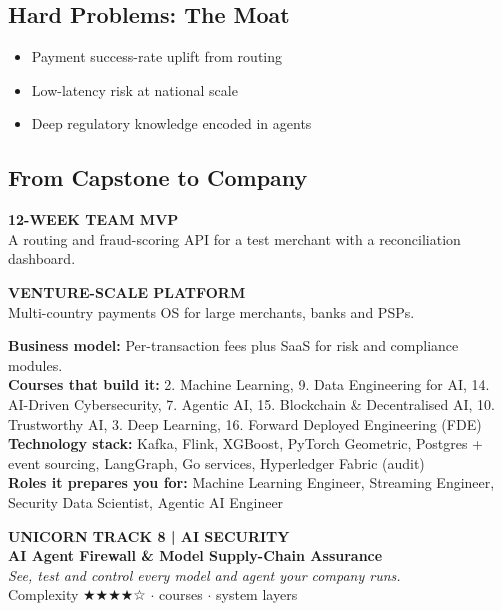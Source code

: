 \documentclass[10pt,a4paper]{article}
\begin{document}
\subsection*{Hard Problems: The Moat}\begin{itemize}\small
\item Payment success-rate uplift from routing
\item Low-latency risk at national scale
\item Deep regulatory knowledge encoded in agents
\end{itemize}
\subsection*{From Capstone to Company}
\begin{tcbraster}[raster columns=2,raster equal height,raster column skip=8pt]\begin{tcolorbox}[colback=l1bg,colframe=l1bg,arc=2pt,borderline north={2.5pt}{0pt}{saffron}]{\scriptsize\bfseries\color{muted}12-WEEK TEAM MVP}\\\small A routing and fraud-scoring API for a test merchant with a reconciliation dashboard.\end{tcolorbox}\begin{tcolorbox}[colback=l3bg,colframe=l3bg,arc=2pt,borderline north={2.5pt}{0pt}{igreen}]{\scriptsize\bfseries\color{muted}VENTURE-SCALE PLATFORM}\\\small Multi-country payments OS for large merchants, banks and PSPs.\end{tcolorbox}\end{tcbraster}
{\small\textbf{Business model:} Per-transaction fees plus SaaS for risk and compliance modules.\\\textbf{Courses that build it:} 2. Machine Learning, 9. Data Engineering for AI, 14. AI-Driven Cybersecurity, 7. Agentic AI, 15. Blockchain \& Decentralised AI, 10. Trustworthy AI, 3. Deep Learning, 16. Forward Deployed Engineering (FDE)\\\textbf{Technology stack:} Kafka, Flink, XGBoost, PyTorch Geometric, Postgres + event sourcing, LangGraph, Go services, Hyperledger Fabric (audit)\\\textbf{Roles it prepares you for:} Machine Learning Engineer, Streaming Engineer, Security Data Scientist, Agentic AI Engineer}
\newpage
\begin{tcolorbox}[colback=navy,colframe=navy,arc=2pt,left=8pt,top=5pt,bottom=5pt]{\small\bfseries\color{goldl}UNICORN TRACK 8 \;|\; AI SECURITY}\\[1pt]{\LARGE\bfseries\color{white}AI Agent Firewall \& Model Supply-Chain Assurance}\\[2pt]{\small\itshape\color{goldl}See, test and control every model and agent your company runs.}\\[2pt]{\small\color{white}Complexity {\color{goldl}★★★★☆} \;$\cdot$ courses \;$\cdot$ system layers}\end{tcolorbox}
\end{document}
